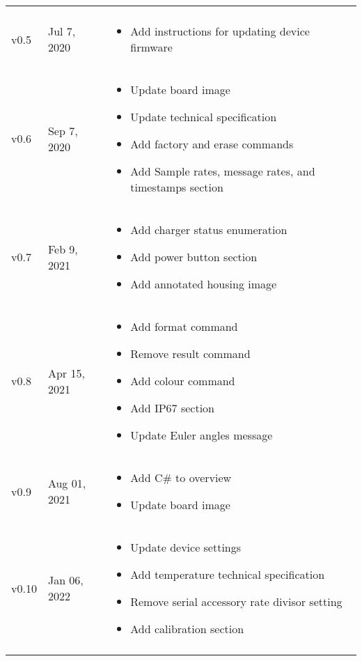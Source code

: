 \begin{longtable}{| >{\centering}p{} | p{} | >{\raggedright\arraybackslash}p{} |}
\begin{itemize}
        \end{itemize}\\
        v0.5 & Jul 7, 2020 &
        \begin{itemize}
			\item Add instructions for updating device firmware
        \end{itemize}\\
        v0.6 & Sep 7, 2020 &
        \begin{itemize}
			\item Update board image
			\item Update technical specification
			\item Add factory and erase commands
			\item Add Sample rates, message rates, and timestamps section
        \end{itemize}\\
        v0.7 & Feb 9, 2021 &
        \begin{itemize}
			\item Add charger status enumeration
			\item Add power button section
			\item Add annotated housing image
        \end{itemize}\\
        v0.8 & Apr 15, 2021 &
        \begin{itemize}
			\item Add format command
			\item Remove result command
			\item Add colour command
			\item Add \ac{IP67} section
			\item Update Euler angles message
        \end{itemize}\\
        v0.9 & Aug 01, 2021 &
        \begin{itemize}
			\item Add C\# to overview
			\item Update board image
        \end{itemize}\\
        v0.10 & Jan 06, 2022 &
        \begin{itemize}
			\item Update device settings
			\item Add temperature technical specification
			\item Remove serial accessory rate divisor setting
			\item Add calibration section
        \end{itemize}\\
        \arrayrulecolor{gray!50}\hline
    \end{longtable}
\endgroup
